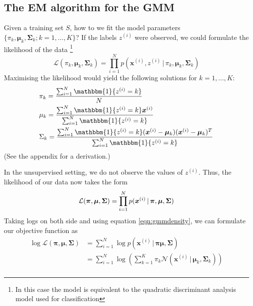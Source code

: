 \documentclass[final,3p,times,twocolumn]{elsarticle}
\begin{document}
\subsection{The EM algorithm for the GMM}
Given a training set $S$, how to we fit the model parameters $\{\pi_k, \boldsymbol \mu_k, \boldsymbol \Sigma_k; k=1,\dots,K\}$?
	If the labels $z^{(i)}$ were observed, we could formulate the likelihood of the data \footnote{In this case the model is equivalent to the quadratic discriminant analysis model used for classification} 
\begin{equation}
\mathcal{L}(\pi_k, \boldsymbol \mu_k, \boldsymbol \Sigma_k) = \prod_{i=1}^N p(\boldsymbol x^{(i)},z^{(i)}\,|\,\pi_k, \boldsymbol \mu_k, \boldsymbol \Sigma_k)
\label{eqn:LDAlikelihood}
\end{equation}
Maximising the likelihood would yield the following solutions for $k = 1,\dots,K$:
\begin{equation}
\begin{split}
\label{eqn:LDAstats}
&\pi_k = \frac{\sum_{i=1}^N \mathbbm{1}\{z^{(i)} = k\}}{N}\\
&\mu_k = \frac{\sum_{i=1}^N \mathbbm{1}\{z^{(i)} = k\} \boldsymbol{x}^{(i)}}{\sum_{i=1}^N \mathbbm{1}\{z^{(i)} = k\}}\\
&\Sigma_k = \frac{\sum_{i=1}^N \mathbbm{1}\{z^{(i)} = k\} (\boldsymbol{x}^{(i)} - \boldsymbol \mu_k)(\boldsymbol{x}^{(i)} - \boldsymbol \mu_k)^T}{\sum_{i=1}^N \mathbbm{1}\{z^{(i)} = k\}}\\
\end{split}
\end{equation}
(See the appendix for a derivation.)

In the unsupervised setting, we do not observe the values of $z^{(i)}$. 
Thus, the likelihood of our data now takes the form
\begin{equation}
	\mathcal{L}(\boldsymbol \pi, \boldsymbol \mu, \boldsymbol \Sigma) = \prod_{i=1}^N p(\boldsymbol x^{(i)}\,|\,\boldsymbol \pi, \boldsymbol \mu, \boldsymbol \Sigma)\\
\label{eqn:gmmLikelihood}
\end{equation}
Taking logs on both side and using equation \ref{eqn:gmmdensity}, we can formulate our objective function as
\begin{equation}
\begin{split}
\log\mathcal{L}(\boldsymbol \pi, \boldsymbol \mu, \boldsymbol \Sigma) &= \sum_{i=1}^N \log p(\boldsymbol x^{(i)}\,|\,\boldsymbol \pi \boldsymbol \mu, \boldsymbol \Sigma)\\
&= \sum_{i=1}^N \log \left(\sum_{k=1}^K \pi_k \mathcal{N}(\boldsymbol x^{(i)}\,|\, \boldsymbol \mu_k, \boldsymbol \Sigma_k)\right)\\
\end{split}
\label{eqn:gmmlogLikelihood}
\end{equation}
\end{document}
